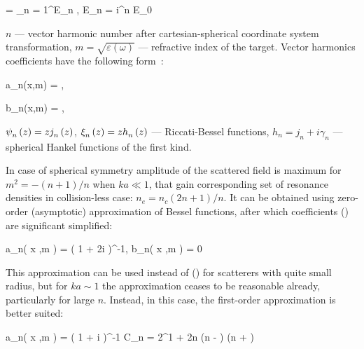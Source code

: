     \eq
		 = \sum_{n = 1}^{\infty}E_n , \qquad E_n = i^{n} E_0 
        \label{E_s_sph}
	\qe

$n$ --- vector harmonic number after cartesian-spherical coordinate system transformation, $m = \sqrt{\varepsilon\left(\omega\right)}$ --- refractive index of the target. Vector harmonics coefficients have the following form~\cite{boren_huffman}:


    \eq
		a_n(x,\:m) = ,
		\label{an_bessel}
	\qe

    \eq
        b_n(x,\:m) = ,
        \label{bn_bessel}
    \qe
    \eqc %
    \cqe %

\noindent ${\psi}_{n}^{} \left( {z} \right) = z {j}_{n}^{} \left( {z} \right)$, ${\xi}_{n}^{} \left( {z} \right) = z {h}_{n}^{} \left( {z} \right)$ --- Riccati-Bessel functions, $h_n = j_n + i \gamma_n$ --- spherical Hankel functions of the first kind. 

In case of spherical symmetry amplitude of the scattered field is maximum for $m^2 = - (n+ 1) / n$ when $ka \ll 1$, that gain corresponding set of resonance densities in collision-less case: $n_e = n_c(2n + 1) / n$. It can be obtained using zero-order (asymptotic) approximation of Bessel functions, after which coefficients () are significant simplified:

    \eq
        a_n\left( x ,\:m \right) = \left( 1 + 2i    \right)^{-1}, \qquad b_n\left( x ,\:m \right) = 0
        \label{ab_asymp}
    \qe

This approximation can be used instead of () for scatterers with quite small radius, but for $ka \sim 1$ the approximation ceases to be reasonable already, particularly for large $n$. Instead, in this case, the first-order approximation is better suited:

    \eq
		a_n\left( x ,\:m \right) = \left( 1 + i  \right)^{-1}
		\label{an_sph_asymp1}
	\qe
	\eqc
		C_n = 2^{1 + 2n} \Gamma(n - ) \Gamma(n + )
	\cqe

